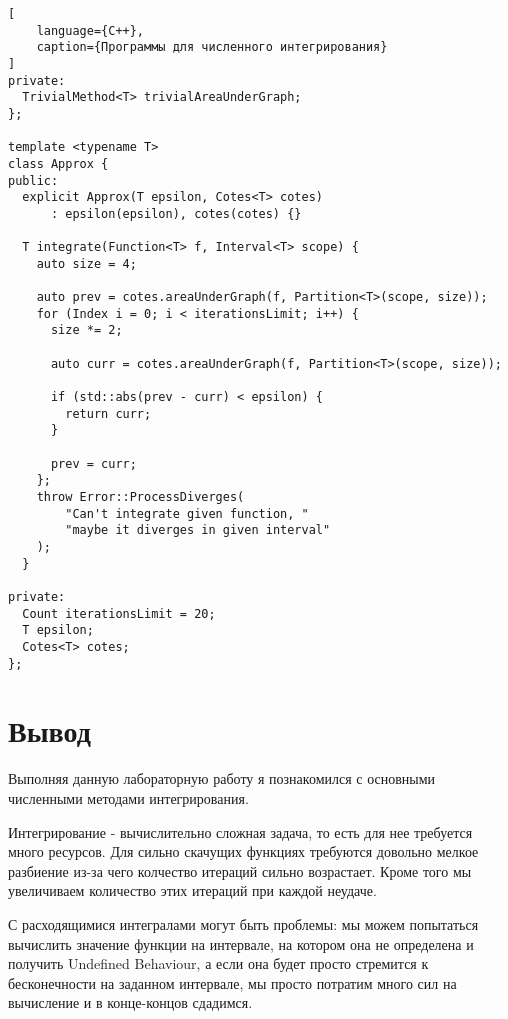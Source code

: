 \documentclass{article}
\begin{document}
\begin{lstlisting}[
    language={C++},
    caption={Программы для численного интегрирования}
]
private:
  TrivialMethod<T> trivialAreaUnderGraph;
};

template <typename T>
class Approx {
public:
  explicit Approx(T epsilon, Cotes<T> cotes)
      : epsilon(epsilon), cotes(cotes) {}

  T integrate(Function<T> f, Interval<T> scope) {
    auto size = 4;

    auto prev = cotes.areaUnderGraph(f, Partition<T>(scope, size));
    for (Index i = 0; i < iterationsLimit; i++) {
      size *= 2;

      auto curr = cotes.areaUnderGraph(f, Partition<T>(scope, size));

      if (std::abs(prev - curr) < epsilon) {
        return curr;
      }

      prev = curr;
    };
    throw Error::ProcessDiverges(
        "Can't integrate given function, "
        "maybe it diverges in given interval"
    );
  }

private:
  Count iterationsLimit = 20;
  T epsilon;
  Cotes<T> cotes;
};
\end{lstlisting}

\section{Вывод}


Выполняя данную лабораторную работу я познакомился с
основными численными методами интегрирования.

Интегрирование - вычислительно сложная задача, то есть
для нее требуется много ресурсов. Для сильно скачущих
функциях требуются довольно мелкое разбиение из-за
чего колчество итераций сильно возрастает. Кроме того
мы увеличиваем количество этих итераций при каждой неудаче.

С расходящимися интегралами могут быть проблемы: мы можем
попытаться вычислить значение функции на интервале, на котором
она не определена и получить Undefined Behaviour, а если она
будет просто стремится к бесконечности на заданном интервале,
мы просто потратим много сил на вычисление и в конце-концов 
сдадимся.
\end{document}
